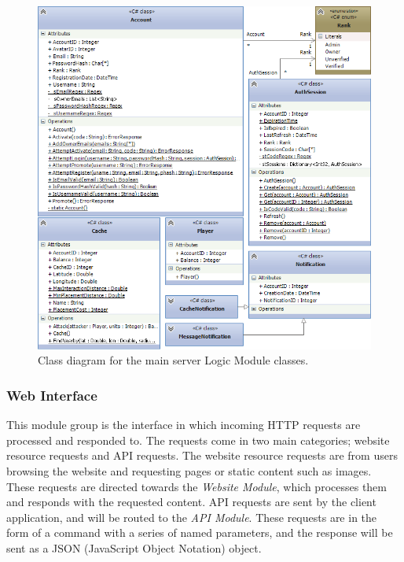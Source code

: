 \begin{figure}[h!]
    \centering
    \includegraphics[width=\textwidth]{svlogiccd}
    \caption{Class diagram for the main server Logic Module classes.}
    \label{fig:svlogicclasses}
\end{figure}

\subsubsection{Web Interface}
This module group is the interface in which incoming HTTP requests are processed and responded to. The requests come in two main categories; website resource requests and API requests. The website resource requests are from users browsing the website and requesting pages or static content such as images. These requests are directed towards the \emph{Website Module}, which processes them and responds with the requested content. API requests are sent by the client application, and will be routed to the \emph{API Module}. These requests are in the form of a command with a series of named parameters, and the response will be sent as a JSON (JavaScript Object Notation) object.

